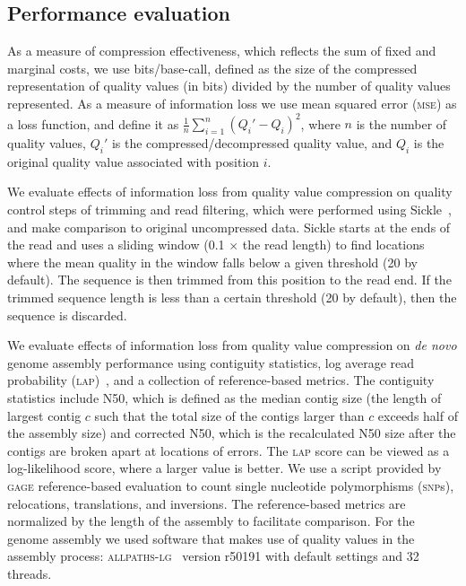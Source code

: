 \documentclass{bioinfo}
\begin{document}
\begin{methods}
\subsection{Performance evaluation}

As a measure of compression effectiveness, which reflects the sum of
fixed and marginal costs, we use
bits/base-call, defined as the size of the compressed representation
of quality values (in bits) divided by the number of quality values
represented. As a measure of information loss we use mean squared
error (\textsc{mse}) as a loss function, and define it as
$\frac{1}{n}\sum_{i=1}^{n}{(Q_i'-Q_i)^2}$, where $n$ is the number of
quality values, $Q_i'$ is the compressed/decompressed quality value,
and $Q_i$ is the original quality value associated with position $i$.

We evaluate effects of information loss from quality value compression
on quality control steps of trimming and read filtering, which were
performed using Sickle~\citep{sickle}, and make comparison to original
uncompressed data. Sickle starts at the ends of the read and uses a
sliding window (0.1 $\times$ the read length) to find locations where
the mean quality in the window falls below a given threshold (20 by
default). The sequence is then trimmed from this position to the read
end. If the trimmed sequence length is less than a certain threshold
(20 by default), then the sequence is discarded.

We evaluate effects of information loss from quality value compression
on \emph{de novo} genome assembly performance using contiguity
statistics, log average read probability
(\textsc{lap})~\citep{Ghodsi:2013hb}, and a collection of
reference-based metrics. The contiguity statistics include N50, which
is defined as the median contig size (the length of largest contig $c$
such that the total size of the contigs larger than $c$ exceeds half
of the assembly size) and corrected N50, which is the recalculated N50
size after the contigs are broken apart at locations of errors. The
\textsc{lap} score can be viewed as a log-likelihood score, where a
larger value is better. We use a script provided by \textsc{gage}
reference-based evaluation to count single nucleotide polymorphisms
(\textsc{snp}s), relocations, translations, and inversions. The
reference-based metrics are normalized by the length of the assembly
to facilitate comparison. For the genome assembly we used software
that makes use of quality values in the assembly process:
\textsc{allpaths-lg}~\citep{Gnerre:2011kx} version r50191 with default
settings and 32 threads.

\end{methods}
\end{document}
